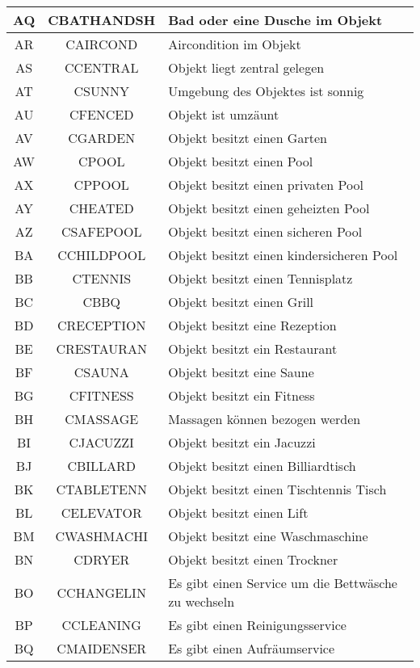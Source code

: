 \begin{longtable}{ | c | c | L{10cm} |}
	AQ & CBATHANDSH & Bad oder eine Dusche im Objekt \\ \hline 
	AR & CAIRCOND & Aircondition im Objekt\\ \hline 
	AS & CCENTRAL & Objekt liegt zentral gelegen \\ \hline 
	AT & CSUNNY & Umgebung des Objektes ist sonnig \\ \hline 
	AU & CFENCED & Objekt ist umzäunt \\ \hline 
	AV & CGARDEN & Objekt besitzt einen Garten \\ \hline 
	AW & CPOOL & Objekt besitzt einen Pool \\ \hline 
	AX & CPPOOL & Objekt besitzt einen privaten Pool \\ \hline 
	AY & CHEATED & Objekt besitzt einen geheizten Pool \\ \hline 
	AZ & CSAFEPOOL & Objekt besitzt einen sicheren Pool \\ \hline 
	BA & CCHILDPOOL & Objekt besitzt einen kindersicheren Pool \\ \hline 
	BB & CTENNIS & Objekt besitzt einen Tennisplatz \\ \hline 
	BC & CBBQ & Objekt besitzt einen Grill \\ \hline 
	BD & CRECEPTION& Objekt besitzt eine Rezeption \\ \hline 
	BE & CRESTAURAN & Objekt besitzt ein Restaurant \\ \hline 
	BF & CSAUNA & Objekt besitzt eine Saune \\ \hline 
	BG & CFITNESS & Objekt besitzt ein Fitness \\ \hline 
	BH & CMASSAGE & Massagen können bezogen werden \\ \hline 
	BI & CJACUZZI& Objekt besitzt ein Jacuzzi \\ \hline 
	BJ & CBILLARD & Objekt besitzt einen Billiardtisch \\ \hline 
	BK & CTABLETENN & Objekt besitzt einen Tischtennis Tisch \\ \hline 
	BL & CELEVATOR & Objekt besitzt einen Lift \\ \hline 
	BM & CWASHMACHI & Objekt besitzt eine Waschmaschine \\ \hline 
	BN & CDRYER & Objekt besitzt einen Trockner \\ \hline 
	BO & CCHANGELIN & Es gibt einen Service um die Bettwäsche zu wechseln \\ \hline 
	BP & CCLEANING & Es gibt einen Reinigungsservice \\ \hline 
	BQ & CMAIDENSER & Es gibt einen Aufräumservice \\ \hline 

\end{longtable}
